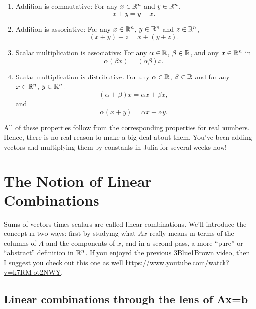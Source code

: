 \vspace*{.5cm}

\begin{tcolorbox}[title=\textbf{Properties of Vector Addition and Scalar Times Vector Multiplication}]

 \begin{enumerate}
        \item Addition is commutative: For any $x \in \mathbb R^n$ and $y \in \mathbb R^n$, 
        $$x+y = y + x.$$
        \item Addition is associative: For any  $x \in \mathbb R^n$,  $y \in \mathbb R^n$  and $z \in \mathbb R^n$, 
        $$\left(x+y\right)+z = x+ \left( y + z \right).$$
        
        \item Scalar multiplication is associative: For any $\alpha \in \mathbb R$, $\beta \in \mathbb R$, and any $x \in \mathbb R^n$ in 
        $$\alpha \left(\beta  x \right) = \left(\alpha \beta\right) x.$$
        \item Scalar multiplication is distributive: For any $\alpha \in \mathbb R$, $\beta\in \mathbb R$ and for any $x \in \mathbb R^n$, $y\in \mathbb R^n$, 
        $$(\alpha + \beta ) x= \alpha x + \beta x ,$$
        and 
         $$\alpha \left(x + y \right) = \alpha x + \alpha y.$$
    \end{enumerate}
    
All of these properties follow from the corresponding properties for real numbers. Hence, there is no real reason to make a big deal about them. You've been adding vectors and multiplying them by constants in Julia for several weeks now!

\end{tcolorbox}



\vspace*{0.5cm}
\section{The Notion of Linear Combinations}

Sums of vectors times scalars are called linear combinations. We'll introduce the concept in two ways: first by studying what $Ax$ really means in terms of the columns of $A$ and the components of $x$, and in a second pass, a more ``pure'' or ``abstract'' definition in $\mathbb R^n$. If you enjoyed the previous 3Blue1Brown video, then I suggest you check out this one as well \url{https://www.youtube.com/watch?v=k7RM-ot2NWY}.

\subsection{Linear combinations through the lens of Ax=b}
\label{sec:LinComboExistSolutinsLensAxb}

